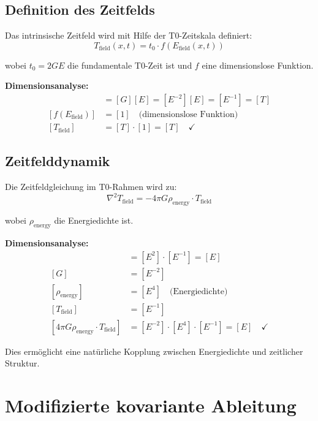 \documentclass[12pt,a4paper]{report}
\newcommand{\tzero}{t_0}                  %
\begin{document}
\subsection{Definition des Zeitfelds}
\label{subsec:time_field_definition}

Das intrinsische Zeitfeld wird mit Hilfe der T0-Zeitskala definiert:
\begin{equation}
	T_{\text{field}}(x,t) = \tzero \cdot f(E_{\text{field}}(x,t))
\end{equation}

wobei $\tzero = 2GE$ die fundamentale T0-Zeit ist und $f$ eine dimensionslose Funktion.

\textbf{Dimensionsanalyse:}
\begin{align}
	[\tzero] &= [G][E] = [E^{-2}][E] = [E^{-1}] = [T] \\
	[f(E_{\text{field}})] &= [1] \quad \text{(dimensionslose Funktion)} \\
	[T_{\text{field}}] &= [T] \cdot [1] = [T] \quad \checkmark
\end{align}

\subsection{Zeitfelddynamik}
\label{subsec:time_field_dynamics}

Die Zeitfeldgleichung im T0-Rahmen wird zu:
\begin{equation}
	\nabla^2 T_{\text{field}} = -4\pi G \rho_{\text{energy}} \cdot T_{\text{field}}
\end{equation}

wobei $\rho_{\text{energy}}$ die Energiedichte ist.

\textbf{Dimensionsanalyse:}
\begin{align}
	[\nabla^2 T_{\text{field}}] &= [E^2] \cdot [E^{-1}] = [E] \\
	[G] &= [E^{-2}] \\
	[\rho_{\text{energy}}] &= [E^4] \quad \text{(Energiedichte)} \\
	[T_{\text{field}}] &= [E^{-1}] \\
	[4\pi G \rho_{\text{energy}} \cdot T_{\text{field}}] &= [E^{-2}] \cdot [E^4] \cdot [E^{-1}] = [E] \quad \checkmark
\end{align}

Dies ermöglicht eine natürliche Kopplung zwischen Energiedichte und zeitlicher Struktur.	
	\section{Modifizierte kovariante Ableitung}
	\label{sec:modified_covariant_derivative}
	
\end{document}
